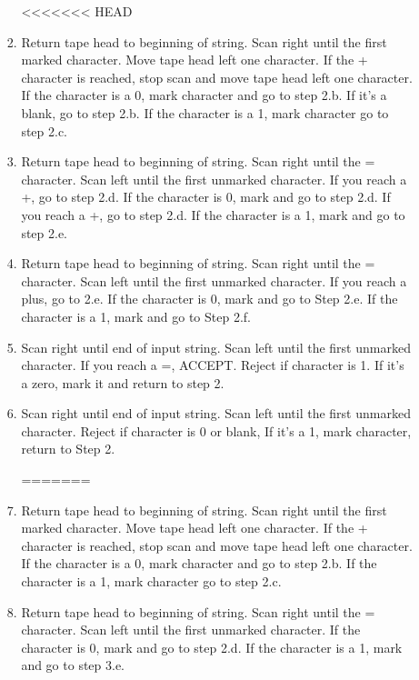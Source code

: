 ﻿\documentclass{article}
\begin{document}
\begin{enumerate}[a)]
\begin{enumerate}[1)]
    \begin{enumerate}[(2.a)]
    
<<<<<<< HEAD
    \item Return tape head to beginning of string. Scan right until the first marked character. Move tape head left one character. If the + character is reached, stop scan and move tape head left one character. If the character is a 0, mark character and go to step 2.b. If it's a blank, go to step 2.b. If the character is a 1, mark character go to step 2.c.

    \item Return tape head to beginning of string. Scan right until the = character. Scan left until the first unmarked character. If you reach a +, go to step 2.d. If the character is 0, mark and go to step 2.d. If you reach a +, go to step 2.d. If the character is a 1, mark and go to step 2.e.
    
    \item Return tape head to beginning of string. Scan right until the = character. Scan left until the first unmarked character. If you reach a plus, go to 2.e. If the character is 0, mark and go to Step 2.e.  If the character is a 1, mark and go to Step 2.f.
    
    \item Scan right until end of input string. Scan left until the first unmarked character. If you reach a =, ACCEPT. Reject if character is 1. If it's a zero, mark it and return to step 2.
    
    \item Scan right until end of input string. Scan left until the first unmarked character. Reject if character is 0 or blank, If it's a 1, mark character, return to Step 2.
    
=======
    \item Return tape head to beginning of string. Scan right until the first marked character. Move tape head left one character. If the + character is reached, stop scan and move tape head left one character. If the character is a 0, mark character and go to step 2.b. If the character is a 1, mark character go to step 2.c.
    
    \item Return tape head to beginning of string. Scan right until the = character. Scan left until the first unmarked character. If the character is 0, mark and go to step 2.d.  If the character is a 1, mark and go to step 3.e.
    

\end{enumerate}
\end{enumerate}
\end{enumerate}
\end{document}

